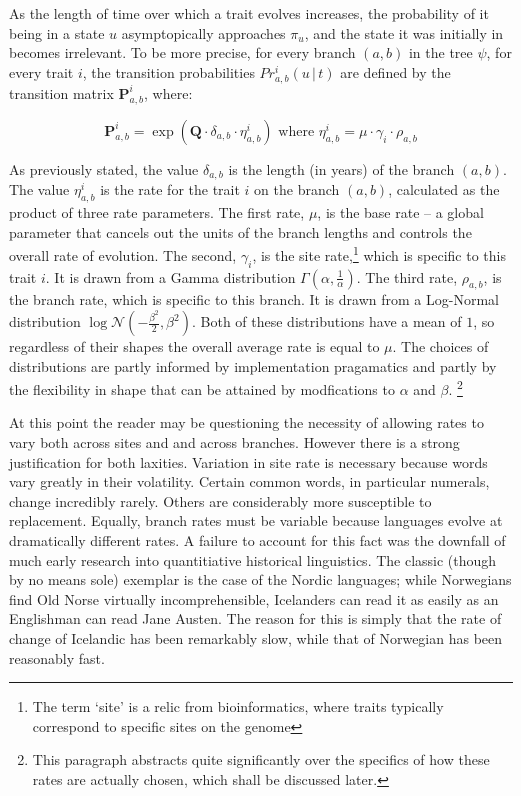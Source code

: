 \documentclass[10pt,journal,compsoc]{IEEEtran}
\begin{document}
As the length of time over which a trait evolves increases, the probability of it being in a state $u$ asymptopically approaches $\pi_u$, and the state it was initially in becomes irrelevant. To be more precise, for every branch $(a, b)$ in the tree $\psi$, for every trait $i$, the transition probabilities $Pr^i_{a,b}\left(u\,\vert\,t\right)$ are defined by the transition matrix $\textbf{P}^i_{a,b}$, where:

\begin{equation}\label{eqn:rate}
\textbf{P}^i_{a,b} = \exp\left(\textbf{Q} \cdot \delta_{a,b} \cdot \eta^i_{a,b}\right) \text{  \ where  \  } \eta^i_{a,b} = \mu \cdot \gamma_i \cdot \rho_{a,b}
\end{equation}

As previously stated, the value $\delta_{a,b}$ is the length (in years) of the branch $(a, b)$. The value $\eta^i_{a,b}$ is the rate for the trait $i$ on the branch $(a, b)$, calculated as the product of three rate parameters. The first rate,  $\mu$, is the base rate -- a global parameter that cancels out the units of the branch lengths and controls the overall rate of evolution. The second, $\gamma_i$, is the site rate,\footnote{The term `site' is a relic from bioinformatics, where traits typically correspond to specific sites on the genome} which is specific to this trait $i$. It is drawn from a Gamma distribution $\Gamma(\alpha, \frac{1}{\alpha})$. The third rate, $\rho_{a,b}$, is the branch rate, which is specific to this branch. It is drawn from a Log-Normal distribution $\log \mathcal{N}(-\frac{\beta^2}{2}, \beta^2)$. Both of these distributions have a mean of $1$, so regardless of their shapes the overall average rate is equal to $\mu$. The choices of distributions are partly informed by implementation pragamatics and partly by the flexibility in shape that can be attained by modfications to $\alpha$ and $\beta$. \footnote{This paragraph abstracts quite significantly over the specifics of how these rates are actually chosen, which shall be discussed later.}

At this point the reader may be questioning the necessity of allowing rates to vary both across sites and and across branches. However there is a strong justification for both laxities. Variation in site rate is necessary because words vary greatly in their volatility. Certain common words, in particular numerals, change incredibly rarely. Others are considerably more susceptible to replacement. Equally, branch rates must be variable because languages evolve at dramatically different rates. A failure to account for this fact was the downfall of much early research into quantitiative historical linguistics. The classic (though by no means sole) exemplar is the case of the Nordic languages; while Norwegians find Old Norse virtually incomprehensible, Icelanders can read it as easily as an Englishman can read Jane Austen. The reason for this is simply that the rate of change of Icelandic has been remarkably slow, while that of Norwegian has been reasonably fast.
\end{document}
